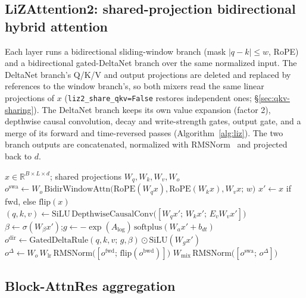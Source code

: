 \documentclass[11pt]{article}
\begin{document}
\subsection{LiZAttention2: shared-projection bidirectional hybrid attention}
\label{sec:liz}

Each layer runs a bidirectional sliding-window branch (mask $|q-k|\le w$, RoPE)
and a bidirectional gated-DeltaNet branch over the same normalized input. The
DeltaNet branch's Q/K/V and output projections are deleted and replaced by
references to the window branch's, so both mixers read the same linear
projections of $x$ (\texttt{liz2\_share\_qkv=False} restores independent
ones; \S\ref{sec:qkv-sharing}). The DeltaNet branch keeps its own value
expansion (factor 2), depthwise causal convolution, decay and write-strength
gates, output gate, and a merge of its forward and time-reversed passes
(Algorithm~\ref{alg:liz}). The two branch outputs are concatenated,
normalized with RMSNorm~\citep{zhang2019rmsnorm} and projected back to $d$.

\begin{algorithm}[t]
\caption{LiZAttention2 forward (one layer)}
\label{alg:liz}
\begin{algorithmic}[1]
\Require $x\in\mathbb{R}^{B\times L\times d}$; shared projections $W_q,W_k,W_v,W_o$
\State $o^{\text{swa}}\gets W_o\,\text{BidirWindowAttn}\big(\text{RoPE}(W_qx),\text{RoPE}(W_kx),W_vx;\,w\big)$
  \State $x'\gets x$ if fwd, else $\text{flip}(x)$ 
  \State $(q,k,v)\gets\text{SiLU}\,\text{DepthwiseCausalConv}\big([W_qx';\,W_kx';\,E_vW_vx']\big)$ 
  \State $\beta\gets\sigma(W_\beta x')$;\quad $g\gets-\exp(A_{\log})\,\text{softplus}(W_ax'+b_{dt})$ 
  \State $o^{\text{dir}}\gets\text{GatedDeltaRule}(q,k,v;\,g,\beta)\odot\text{SiLU}(W_gx')$ 
\EndFor
\State $o^{\Delta}\gets W_o\,W_{\text{lr}}\,\text{RMSNorm}\big([o^{\text{fwd}};\,\text{flip}(o^{\text{bwd}})]\big)$
\State \Return $W_{\text{mix}}\,\text{RMSNorm}\big([o^{\text{swa}};\,o^{\Delta}]\big)$ 
\end{algorithmic}
\end{algorithm}

\subsection{Block-AttnRes aggregation}
\label{sec:attnres}
\end{document}
